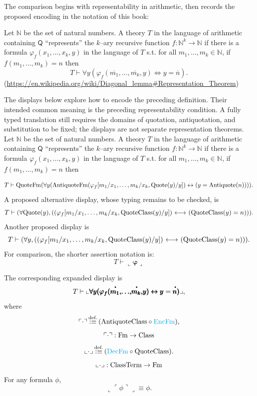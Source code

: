 The comparison begins with representability in arithmetic, then records the proposed encoding in the notation of this book:
\begin{definition*}
Let $\mathbb{N}$ be the set of natural numbers. A %
theory $T$ in the language of arithmetic containing $\mathsf{Q}$ ``represents'' the $k$--ary recursive function $f: \mathbb{N}^k\rightarrow\mathbb{N}$ if there is a formula $\varphi_f(x_1, \dots, x_k, y)$ in the language of $T$ s.t. for all $m_1, \dots, m_k \in \mathbb{N}$, if $f(m_1, \dots, m_k) =  n$ then \[
T \vdash \forall y (\varphi_f (\overline{m_1}, \dots, \overline{m_k}, y) \iff y = \overline{n} ).
\]
(\url{https://en.wikipedia.org/wiki/Diagonal_lemma#Representation_Theorem})
\end{definition*}
\begin{example*}
The displays below explore how to encode the preceding definition. Their
intended common meaning is the preceding representability condition. A fully
typed translation still requires the domains of quotation, antiquotation,
and substitution to be fixed; the displays are not separate representation
theorems.
Let $\mathbb{N}$ be the set of natural numbers. 
A%
 theory $T$ in the language of arithmetic containing $\mathsf{Q}$ ``represents'' the $k$--ary recursive function $f: \mathbb{N}^k\rightarrow\mathbb{N}$ if there is a formula $\varphi_f(x_1, \dots, x_k, y)$ in the language of $T$ s.t. 
for all $m_1, \dots, m_k \in \mathbb{N}$, if $f(m_1, \dots, m_k) =  n$ then 

\[
T \vdash {\text{Quote}}\mathrm{Fm}(\forall y (\text{Antiquote}\mathrm{Fm}(\varphi_f[m_1/x_1, \dots, m_k/x_k, {\text{Quote}}(y)/y]) \leftrightarrow (y = \text{Antiquote}(n)) )).
\]
A proposed alternative display, whose typing remains to be checked, is
\[
T \vdash (\forall {\text{Quote}}(y), ((\varphi_f[m_1/x_1, \dots, m_k/x_k, {\text{Quote}}{\text{Class}}(y)/y]) {\ \longleftrightarrow\ } ({\text{Quote}}{\text{Class}}(y) = n) )).
\]
Another proposed display is
\[
T \vdash (\forall y, ((\varphi_f[m_1/x_1, \dots, m_k/x_k, {\text{Quote}}{\text{Class}}(y)/y]) {\ \longleftrightarrow\ } ({\text{Quote}}{\text{Class}}(y) = n) )).
\]
For comparison, the shorter assertion notation is:
\[
T \vdash \llcorner \pmb{\varphi} \lrcorner
\]

The corresponding expanded display is
\[
T \vdash \llcorner
\pmb{ \forall } \pmb{y} \pmb{(}\pmb{\varphi}_{\pmb{f}} \pmb{(}\boldmeta{m_1}\pmb{,} \pmb{\dots}\pmb{,} \boldmeta{m_k}\pmb{,} \pmb{y}\pmb{)} \pmb{\leftrightarrow} \pmb{y} = \boldmeta{n} \pmb{)}\lrcorner,
\]
where
\[
\ulcorner\cdot\urcorner \,{\stackrel{{\textrm{def.}}}{:\equiv}}\, (\text{AntiquoteClass} \circ {\text{\textcolor{cyan}{EncFm}}}),
\]
\[
\ulcorner\cdot\urcorner : \mathrm{Fm} \to {\text{Class}}
\]
\[
\llcorner\cdot\lrcorner \,{\stackrel{{\textrm{def.}}}{:\equiv}}\, ({\text{\textcolor{cyan}{DecFm}}} \circ \text{QuoteClass}).
\]%
\[
\llcorner\cdot\lrcorner : {\text{ClassTerm}} \to \mathrm{Fm}
\]
For any formula $\phi$,
\[
\llcorner\ulcorner\phi\urcorner\lrcorner
\equiv
\phi.
\]
\end{example*}
